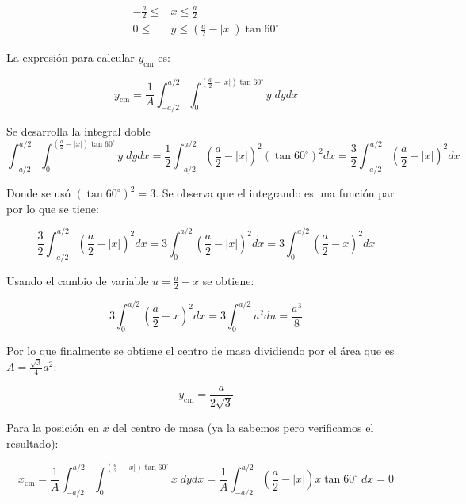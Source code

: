 \documentclass[a4paper,11pt]{article}
\begin{document}
\begin{align*}
  -\frac{a}{2} \leq &x \leq \frac{a}{2}\\
 0 \leq &y \leq \left(\frac{a}{2} - |x|\right) \tan 60^{\circ}
\end{align*}

La expresión para calcular $y_{\text{cm}}$ es:


\begin{equation*}
\label{3} y_{\text{cm}} = \frac{1}{A} \int_{-a/2}^{a/2} \int_{0}^{ \left(\frac{a}{2} - |x|\right) \tan 60^{\circ}}   y\; dy dx
\end{equation*}

Se desarrolla la integral doble
\begin{equation*}
\label{4}  \int_{-a/2}^{a/2} \int_{0}^{ \left(\frac{a}{2} - |x|\right) \tan 60^{\circ}}   y\; dy dx = \frac{1}{2} \int_{-a/2}^{a/2} \left(\frac{a}{2} - |x|\right)^2 (\tan 60^{\circ})^2 dx = \frac{3}{2} \int_{-a/2}^{a/2} \left(\frac{a}{2} - |x|\right)^2  dx
\end{equation*}


Donde se usó $(\tan 60^{\circ})^2 = 3$. Se observa que el integrando es una función par por lo que se tiene:



\begin{equation*}
 \frac{3}{2} \int_{-a/2}^{a/2} \left(\frac{a}{2} - |x|\right)^2  dx = 3 \int_{0}^{a/2} \left(\frac{a}{2} - |x|\right)^2  dx =  3 \int_{0}^{a/2} \left(\frac{a}{2} - x\right)^2  dx
\end{equation*}

Usando el cambio de variable $u = \frac{a}{2} - x$ se obtiene:


\begin{equation*}
3 \int_{0}^{a/2} \left(\frac{a}{2} - x\right)^2  dx =  3 \int_{0}^{a/2} u^2 du = \frac{a^3}{8}
\end{equation*}

Por lo que finalmente se obtiene el centro de masa dividiendo por el área que es $A = \frac{\sqrt{3}}{4}a^2$:


\begin{equation*}
 y_{\text{cm}} = \frac{a}{2 \sqrt{3}}
\end{equation*}

Para la posición en $x$ del centro de masa (ya la sabemos pero verificamos el resultado):



\begin{equation*}
x_{\text{cm}} = \frac{1}{A} \int_{-a/2}^{a/2} \int_{0}^{ \left(\frac{a}{2} - |x|\right) \tan 60^{\circ}}   x\; dy dx = \frac{1}{A} \int_{-a/2}^{a/2}   \left(\frac{a}{2} - |x|\right)  x \tan 60^{\circ}\;  dx = 0
\end{equation*}
\end{document}

